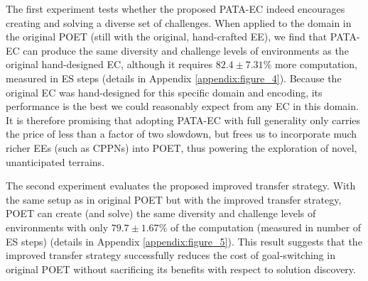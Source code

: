 \documentclass{article}
\newcommand{\ks}[1]{\comments{\textcolor{purple}{[Ken: #1]}}}
\newcommand{\rwang}[1]{\comments{\textcolor{blue}{[Rui: #1]}}}
\newcommand{\comments}[1]{#1} %
\begin{document}
The first experiment tests whether the proposed PATA-EC indeed encourages creating and solving a diverse set of challenges. When applied to the domain in the original POET (still with the original, hand-crafted EE), we find that PATA-EC can produce the same diversity and challenge levels of environments as the original hand-designed EC, although it requires $82.4 \pm 7.31 \%$ more computation, measured in ES steps (details in Appendix \ref{appendix:figure_4}). 
Because the original EC was hand-designed for this specific domain and encoding, its performance is the best we could reasonably expect from any EC in this domain. It is therefore promising that adopting PATA-EC with full generality only carries the price of less than a factor of two slowdown, but frees us to incorporate much richer EEs (such as CPPNs) into POET, thus powering the exploration of novel, unanticipated terrains.

The second experiment evaluates the proposed improved transfer strategy. With the same setup as in original POET \cite{wang2019paired, wang2019poetGECCO} but with the improved transfer strategy,  POET can create  (and solve) the same diversity and challenge levels of environments with only $79.7\pm1.67\%$ of the computation (measured in number of ES steps) (details in Appendix \ref{appendix:figure_5}). This result suggests that the improved transfer strategy successfully reduces the cost of goal-switching in original POET without sacrificing its benefits with respect to solution discovery. 
\end{document}

